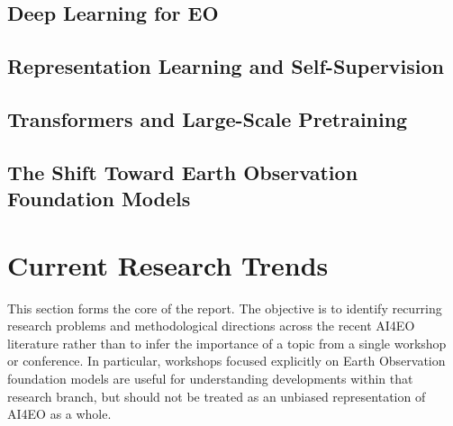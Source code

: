 \documentclass[11pt,a4paper]{article}
\begin{document}

\subsection{Deep Learning for EO}


\subsection{Representation Learning and Self-Supervision}


\subsection{Transformers and Large-Scale Pretraining}


\subsection{The Shift Toward Earth Observation Foundation Models}


\section{Current Research Trends}

This section forms the core of the report. The objective is to identify
recurring research problems and methodological directions across the
recent AI4EO literature rather than to infer the importance of a topic
from a single workshop or conference. In particular, workshops focused
explicitly on Earth Observation foundation models are useful for
understanding developments within that research branch, but should not
be treated as an unbiased representation of AI4EO as a whole.
\end{document}
